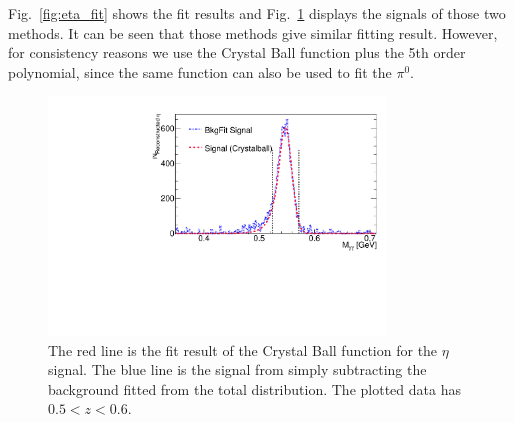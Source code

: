  Fig.~\ref{fig:eta_fit} shows the fit results and Fig.~\ref{fig:etasignal} displays the signals of those two methods. It can be seen that those methods give similar fitting result. However, for consistency reasons we use the Crystal Ball function plus the 5th order polynomial, since the same function can also be used to fit the $\pi^0$.

\begin{figure}[H]
\centering
\includegraphics[width=0.8\textwidth,natwidth=610,natheight=642]{figure_dataselection/eta_Signal_Z_4.pdf}
\caption{The red line is the fit result of the Crystal Ball function for the $\eta$ signal. The blue line is the signal from simply subtracting the background fitted from the total distribution. The plotted data has $0.5<z<0.6$.}
\label{fig:etasignal}
\end{figure}

